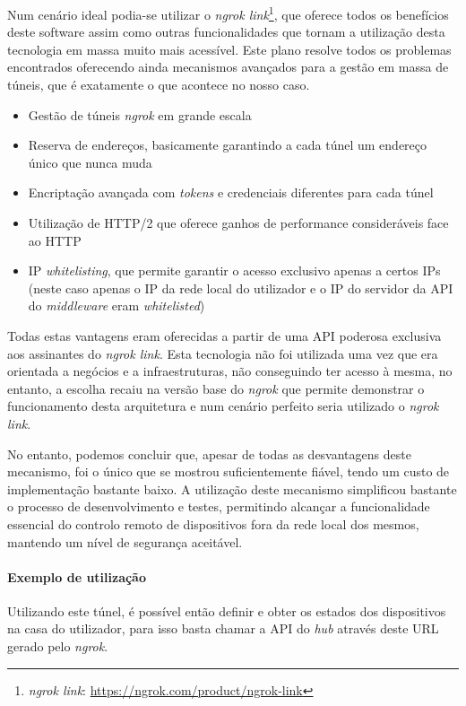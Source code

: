 Num cenário ideal podia-se utilizar o \textit{ngrok link}\footnote{\textit{ngrok link}: \url{https://ngrok.com/product/ngrok-link}}, que oferece todos os benefícios deste software assim como outras funcionalidades que tornam a utilização desta tecnologia em massa muito mais acessível. Este plano resolve todos os problemas encontrados oferecendo ainda mecanismos avançados para a gestão em massa de túneis, que é exatamente o que acontece no nosso caso.
\begin{itemize}
    \item Gestão de túneis \textit{ngrok} em grande escala
    \item Reserva de endereços, basicamente garantindo a cada túnel um endereço único que nunca muda
    \item Encriptação avançada com \textit{tokens} e credenciais diferentes para cada túnel
    \item Utilização de HTTP/2 que oferece ganhos de performance consideráveis face ao HTTP
    \item IP \textit{whitelisting}, que permite garantir o acesso exclusivo apenas a certos IPs (neste caso apenas o IP da rede local do utilizador e o IP do servidor da API do \textit{middleware} eram \textit{whitelisted})
\end{itemize}

Todas estas vantagens eram oferecidas a partir de uma API poderosa exclusiva aos assinantes do \textit{ngrok link}. Esta tecnologia não foi utilizada uma vez que era orientada a negócios e a infraestruturas, não conseguindo ter acesso à mesma, no entanto, a escolha recaiu na versão base do \textit{ngrok} que permite demonstrar o funcionamento desta arquitetura e num cenário perfeito seria utilizado o \textit{ngrok link}.

No entanto, podemos concluir que, apesar de todas as desvantagens deste mecanismo, foi o único que se mostrou suficientemente fiável, tendo um custo de implementação bastante baixo. A utilização deste mecanismo simplificou bastante o processo de desenvolvimento e testes, permitindo alcançar a funcionalidade essencial do controlo remoto de dispositivos fora da rede local dos mesmos, mantendo um nível de segurança aceitável.

\paragraph*{Exemplo de utilização}

Utilizando este túnel, é possível então definir e obter os estados dos dispositivos na casa do utilizador, para isso basta chamar a API do \textit{hub} através deste URL gerado pelo \textit{ngrok}.


